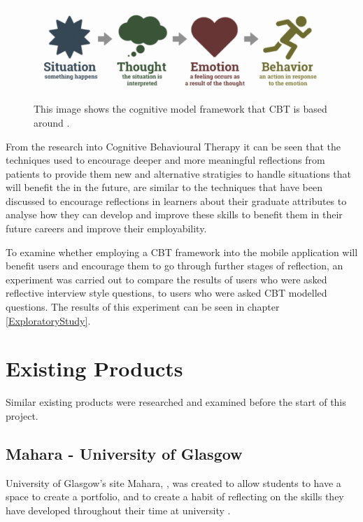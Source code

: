 \documentclass{l4proj}
\begin{document}
\begin{figure}[h!]
    \begin{centering}
    \includegraphics[scale=0.5]{images/cognitive-model.png}
    \caption{This image shows the cognitive model framework that CBT is based around \citep{therapist_aid_psychoeducation}.}
    \label{fig: UserStudyGraph}
    \end{centering}
\end{figure}

From the research into Cognitive Behavioural Therapy it can be seen that the techniques used to encourage deeper and more meaningful reflections from 
patients to provide them new and alternative stratigies to handle situations that will benefit the in the future, are similar to the techniques that 
have been discussed to encourage reflections in learners about their graduate attributes to analyse how they can develop and improve these skills to 
benefit them in their future careers and improve their employability.

To examine whether employing a CBT framework into the mobile application will benefit users and encourage them to go through further stages of reflection,
an experiment was carried out to compare the results of users who were asked reflective interview style questions, to users who were asked CBT modelled
questions. The results of this experiment can be seen in chapter \ref{ExploratoryStudy}.

\section{Existing Products}

Similar existing products were researched and examined before the start of this project.

\subsection{Mahara - University of Glasgow}

University of Glasgow's site Mahara, \citep{mahara_dashboard}, was created to allow students to have a space to create a portfolio, and to create a habit of reflecting on the 
skills they have developed throughout their time at university \citep{glasgow_university_attributes}.
\end{document}
